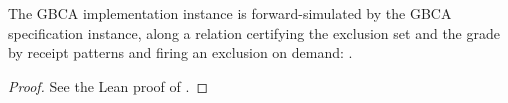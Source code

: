 \begin{theorem}
  \label{thm:gbca-inst-refines}
  \leanok
  The GBCA implementation instance is forward-simulated by the GBCA specification instance, along a relation certifying the exclusion set and the grade by receipt patterns and firing an exclusion on demand: .
\end{theorem}

\begin{proof}\leanok
  See the Lean proof of .
\end{proof}

